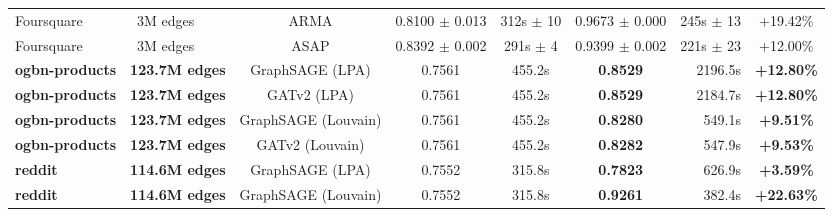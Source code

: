 \begin{table}[!t]
\begin{tabular}{llccccrc}
Foursquare & ~3M edges & ARMA & 0.8100 $\pm$ 0.013 & 312s $\pm$ 10 & 0.9673 $\pm$ 0.000 & 245s $\pm$ 13 & +19.42\% \\
Foursquare & ~3M edges & ASAP & 0.8392 $\pm$ 0.002 & 291s $\pm$ 4 & 0.9399 $\pm$ 0.002 & 221s $\pm$ 23 & +12.00\% \\
\midrule
\textbf{ogbn-products} & \textbf{123.7M edges} & GraphSAGE (LPA) & 0.7561 & 455.2s & \textbf{0.8529} & 2196.5s & \textbf{+12.80\%} \\
\textbf{ogbn-products} & \textbf{123.7M edges} & GATv2 (LPA) & 0.7561 & 455.2s & \textbf{0.8529} & 2184.7s & \textbf{+12.80\%} \\
\textbf{ogbn-products} & \textbf{123.7M edges} & GraphSAGE (Louvain) & 0.7561 & 455.2s & \textbf{0.8280} & 549.1s & \textbf{+9.51\%} \\
\textbf{ogbn-products} & \textbf{123.7M edges} & GATv2 (Louvain) & 0.7561 & 455.2s & \textbf{0.8282} & 547.9s & \textbf{+9.53\%} \\
\midrule
\textbf{reddit} & \textbf{114.6M edges} & GraphSAGE (LPA) & 0.7552 & 315.8s & \textbf{0.7823} & 626.9s & \textbf{+3.59\%} \\
\textbf{reddit} & \textbf{114.6M edges} & GraphSAGE (Louvain) & 0.7552 & 315.8s & \textbf{0.9261} & 382.4s & \textbf{+22.63\%} \\
\bottomrule
\end{tabular}
\end{table}
